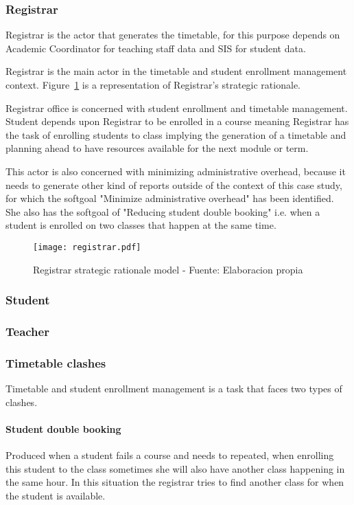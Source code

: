 \subsubsection{Registrar}
Registrar is the actor that generates the timetable, for this purpose depends on Academic Coordinator for teaching staff data and SIS for student data.

Registrar is the main actor in the timetable and student enrollment management context.
Figure~\ref{fig:actorBoundaryRegistrar} is a representation of Registrar's strategic rationale.

Registrar office is concerned with student enrollment and timetable management.
Student depends upon Registrar to be enrolled in a course meaning Registrar has the task of enrolling students to class implying the generation of a timetable and planning ahead to have resources available for the next module or term.

This actor is also concerned with minimizing administrative overhead, because it needs to generate other kind of reports outside of the context of this case study, for which the softgoal "Minimize administrative overhead" has been identified.
She also has the softgoal of "Reducing student double booking" i.e. when a student is enrolled on two classes that happen at the same time.

\begin{landscape}
	\begin{figure}
		\caption{Registrar strategic rationale model - Fuente: Elaboracion propia}
		\texttt{[image: registrar.pdf]}
		\label{fig:actorBoundaryRegistrar}
	\end{figure}
\end{landscape}


\subsubsection{Student}
\subsubsection{Teacher}

\subsubsection{Timetable clashes}
Timetable and student enrollment management is a task that faces two types of clashes.

\paragraph{Student double booking} Produced when a student fails a course and needs to repeated, when enrolling this student to the class sometimes she will also have another class happening in the same hour.
In this situation the registrar tries to find another class for when the student is available.

